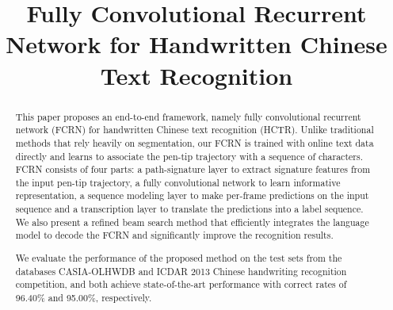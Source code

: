 \documentclass[10pt,conference,a4paper]{IEEEtran}
\begin{document}
%
\title{Fully Convolutional Recurrent Network for Handwritten Chinese Text Recognition}


\author{
}

\maketitle

\begin{abstract}
This paper proposes an end-to-end framework, namely fully convolutional recurrent network (FCRN) for handwritten Chinese text recognition (HCTR).
Unlike traditional methods that rely heavily on segmentation, our FCRN is trained with online text data directly and learns to associate the pen-tip trajectory with a sequence of characters.
FCRN consists of four parts: a path-signature layer to extract signature features from the input pen-tip trajectory, a fully convolutional network to learn informative representation, a sequence modeling layer to make per-frame predictions on the input sequence and a transcription layer to translate the predictions into a label sequence.
We also present a refined beam search method that efficiently integrates the language model to decode the FCRN and significantly improve the recognition results.


We evaluate the performance of the proposed method on the test sets from the databases CASIA-OLHWDB and ICDAR 2013 Chinese handwriting recognition competition, and both achieve state-of-the-art performance with correct rates of 96.40\% and 95.00\%, respectively.
\end{abstract}
\end{document}
